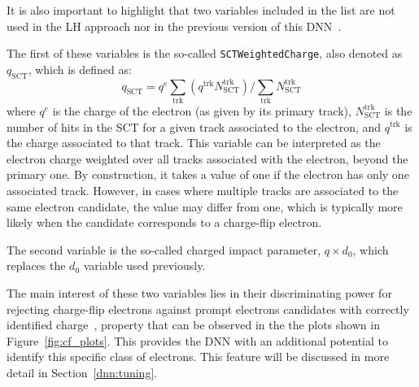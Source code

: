 It is also important to highlight that two variables included in the list are not used in the LH approach nor in the previous version of this DNN~\cite{dnn_paper}. 

The first of these variables is the so-called \texttt{SCTWeightedCharge}, also denoted as $q_{\text{SCT}}$, which is defined as:
\begin{equation}
  q_{\text{SCT}} = q^{e}\sum_{\text{trk}}\left( q^{\text{trk}}N^{\text{trk}}_{\text{SCT}} \right)/\sum_{\text{trk}} N^{\text{trk}}_{\text{SCT}}
\end{equation}
where $q^{e}$ is the charge of the electron (as given by its primary track), $N^{\text{trk}}_{\text{SCT}}$ is the number of hits in the SCT for a given track associated to the electron, and $q^{\text{trk}}$ is the charge associated to that track. This variable can be interpreted as the electron charge weighted over all tracks associated with the electron, beyond the primary one. By construction, it takes a value of one if the electron has only one associated track. However, in cases where multiple tracks are associated to the same electron candidate, the value may differ from one, which is typically more likely when the candidate corresponds to a charge-flip electron.

The second variable is the so-called charged impact parameter, $q \times d_{0}$, which replaces the $d_{0}$ variable used previously.

The main interest of these two variables lies in their discriminating power for rejecting charge-flip electrons against prompt electrons candidates with correctly identified charge~\cite{carnelli}, property that can be observed in the the plots shown in Figure~\ref{fig:cf_plots}. This provides the DNN with an additional potential to identify this specific class of electrons. This feature will be discussed in more detail in Section~\ref{dnn:tuning}.

